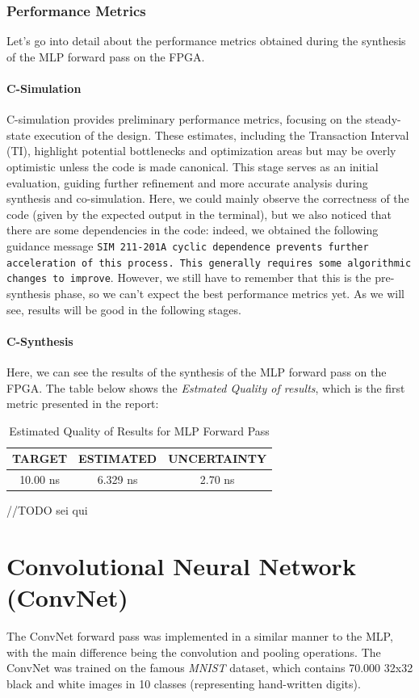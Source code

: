 \documentclass{article}
\begin{document}
\subsubsection{Performance Metrics}
Let's go into detail about the performance metrics obtained during the synthesis of the MLP forward pass on the FPGA.

\paragraph{C-Simulation}  
C-simulation provides preliminary performance metrics, focusing on the steady-state execution of the design. These estimates, including the Transaction Interval (TI), highlight potential bottlenecks and optimization areas but may be overly optimistic unless the code is made canonical. This stage serves as an initial evaluation, guiding further refinement and more accurate analysis during synthesis and co-simulation.  
Here, we could mainly observe the correctness of the code (given by the expected output in the terminal), but we also noticed that there are some dependencies in the code: indeed, we obtained the following guidance message \texttt{SIM 211-201A cyclic dependence prevents further acceleration of this process. This generally requires some algorithmic changes to improve}. However, we still have to remember that this is the pre-synthesis phase, so we can't expect the best performance metrics yet. As we will see, results will be good in the following stages. 


\paragraph{C-Synthesis}
Here, we can see the results of the synthesis of the MLP forward pass on the FPGA. The table below shows the \textit{Estmated Quality of results}, which is the first metric presented in the report:

\begin{table}[H]
    \centering
    \begin{tabular}{|c|c|c|}
        \hline
        \textbf{TARGET} & \textbf{ESTIMATED} & \textbf{UNCERTAINTY} \\
        \hline
        10.00 ns & 6.329 ns & 2.70 ns \\
        \hline
    \end{tabular}
    \caption{\centering Estimated Quality of Results for MLP Forward Pass}
    \label{tab:mlp-quality}
\end{table}


//TODO sei qui

\section{Convolutional Neural Network (ConvNet)}
The ConvNet forward pass was implemented in a similar manner to the MLP, with the main difference being the convolution and pooling operations. The ConvNet was trained on the famous \textit{MNIST} dataset, which contains 70.000 32x32 black and white images in 10 classes (representing hand-written digits).
\end{document}
